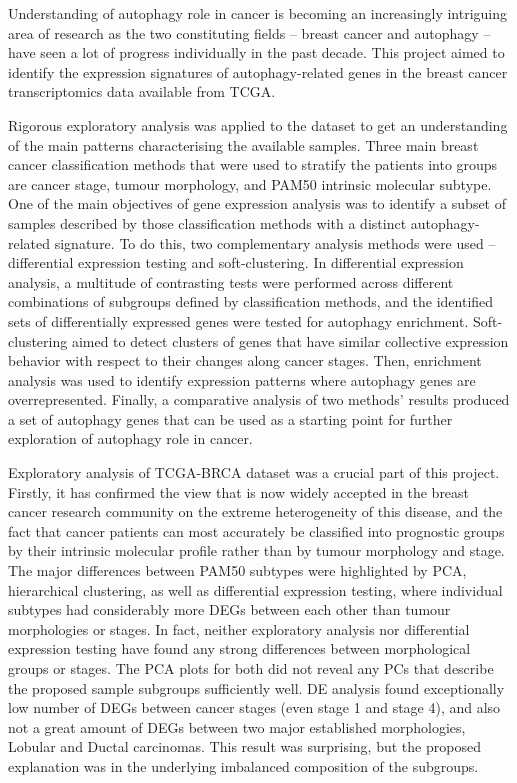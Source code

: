 Understanding of autophagy role in cancer is becoming an increasingly intriguing area of research as the two constituting fields -- breast cancer and autophagy -- have seen a lot of progress individually in the past decade. This project aimed to identify the expression signatures of autophagy-related genes in the breast cancer transcriptomics data available from TCGA. 

Rigorous exploratory analysis was applied to the dataset to get an understanding of the main patterns characterising the available samples. Three main breast cancer classification methods that were used to stratify the patients into groups are cancer stage, tumour morphology, and PAM50 intrinsic molecular subtype. One of the main objectives of gene expression analysis was to identify a subset of samples described by those classification methods with a distinct autophagy-related signature. To do this, two complementary analysis methods were used -- differential expression testing and soft-clustering. 
In differential expression analysis, a multitude of contrasting tests were performed across different combinations of subgroups defined by classification methods, and the identified sets of differentially expressed genes were tested for autophagy enrichment. Soft-clustering aimed to detect clusters of genes that have similar collective expression behavior with respect to their changes along cancer stages. Then, enrichment analysis was used to identify expression patterns where autophagy genes are overrepresented. Finally, a comparative analysis of two methods' results produced a set of autophagy genes that can be used as a starting point for further exploration of autophagy role in cancer.

Exploratory analysis of TCGA-BRCA dataset was a crucial part of this project. Firstly, it has confirmed the view that is now widely accepted in the breast cancer research community on the extreme heterogeneity of this disease, and the fact that cancer patients can most accurately be classified into prognostic groups by their intrinsic molecular profile rather than by tumour morphology and stage. The major differences between PAM50 subtypes were highlighted by PCA, hierarchical clustering, as well as differential expression testing, where individual subtypes had considerably more DEGs between each other than tumour morphologies or stages. In fact, neither exploratory analysis nor differential expression testing have found any strong differences between morphological groups or stages. The PCA plots for both did not reveal any PCs that describe the proposed sample subgroups sufficiently well. DE analysis found exceptionally low number of DEGs between cancer stages (even stage 1 and stage 4), and also not a great amount of DEGs between two major established morphologies, Lobular and Ductal carcinomas. This result was surprising, but the proposed explanation was in the underlying imbalanced composition of the subgroups. 


